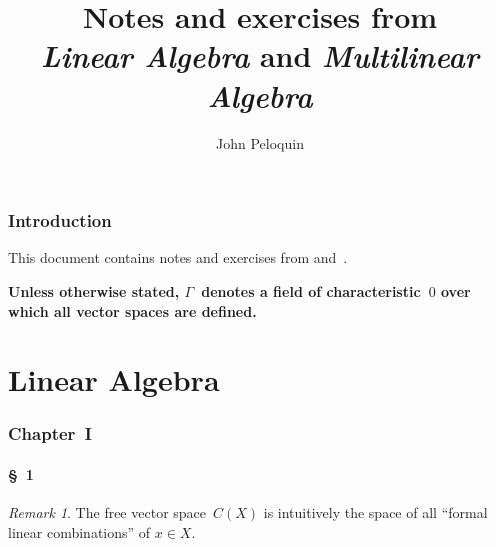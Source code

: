 \documentclass[letterpaper,12pt]{article}
\title{Notes and exercises from\\\textit{Linear Algebra} and \textit{Multilinear Algebra}}
\author{John Peloquin}
\date{}
\theoremstyle{definition}
\theoremstyle{remark}
\newtheorem*{rmk}{Remark}
\begin{document}
\maketitle

\section*{Introduction}
This document contains notes and exercises from \cite{greub1} and~\cite{greub2}.

\bigskip
\noindent
{\boldmath\textbf{Unless otherwise stated, \(\Gamma\)~denotes a field of characteristic~\(0\) over which all vector spaces are defined.}}

\newpage
\part*{Linear Algebra}
\section*{Chapter~I}
\subsection*{\S~1}
\begin{rmk}
The free vector space~\(C(X)\) is intuitively the space of all ``formal linear combinations'' of \(x\in X\).
\end{rmk}
\end{document}
